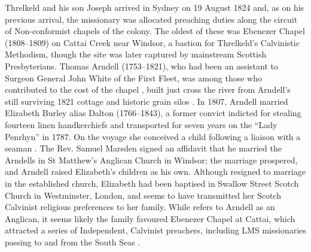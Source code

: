 Threlkeld and his son Joseph arrived in Sydney on 19 August 1824 and, as on his previous arrival, the missionary was allocated preaching duties along the circuit of Non-conformist chapels of the colony. The oldest of these was Ebenezer Chapel (1808--1809) on Cattai Creek near Windsor, a bastion for Threlkeld’s Calvinistic Methodism, though the site was later captured by mainstream Scottish Presbyterians. Thomas Arndell (1753--1821), who had been an assistant to Surgeon General John White of the First Fleet, was among those who contributed to the cost of the chapel \citep{fletcher_arndell_1966}, built just cross the river from Arndell’s still surviving 1821 cottage and historic grain silos \citep[217]{boon_hawkesbury_2017}. In 1807, Arndell married Elizabeth Burley alias Dalton (1766--1843), a former convict indicted for stealing fourteen linen handkerchiefs and transported for seven years on the “Lady Penrhyn” in 1787. On the voyage she conceived a child following a liaison with a seaman \citep{gillen_founders_1989}. The Rev. Samuel Marsden signed an affidavit that he married the Arndells in St Matthew’s Anglican Church in Windsor; the marriage prospered, and Arndell raised Elizabeth’s children as his own. Although resigned to marriage in the established church, Elizabeth had been baptised in Swallow Street Scotch Church in Westminster, London, and seems to have transmitted her Scotch Calvinist religious preferences to her family. While \citet{fletcher_arndell_1966} refers to Arndell as an Anglican, it seems likely the family favoured Ebenezer Chapel at Cattai, which attracted a series of Independent, Calvinist preachers, including LMS missionaries passing to and from the South Seas \citep[21]{gunson_australian_1974a}.

